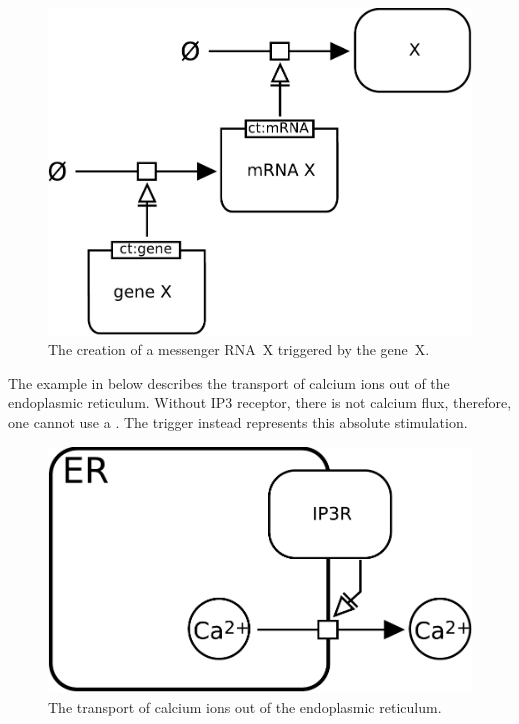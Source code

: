 \begin{figure}[H]
  \centering
  \includegraphics[scale = 0.5]{examples/trigger-genetic}
  \caption{The creation of a messenger RNA~X triggered by the gene~X.}
  \label{fig:trigger-gene}
\end{figure}


The example in  below describes the transport of calcium ions out of the endoplasmic reticulum. Without IP3 receptor, there is not calcium flux, therefore, one cannot use a . The trigger instead represents this absolute stimulation.

\begin{figure}[H]
  \centering
  \includegraphics[scale = 0.5]{examples/trigger-transport}
  \caption{The transport of calcium ions out of the endoplasmic reticulum.}
  \label{fig:trigger-calcium}
\end{figure}



